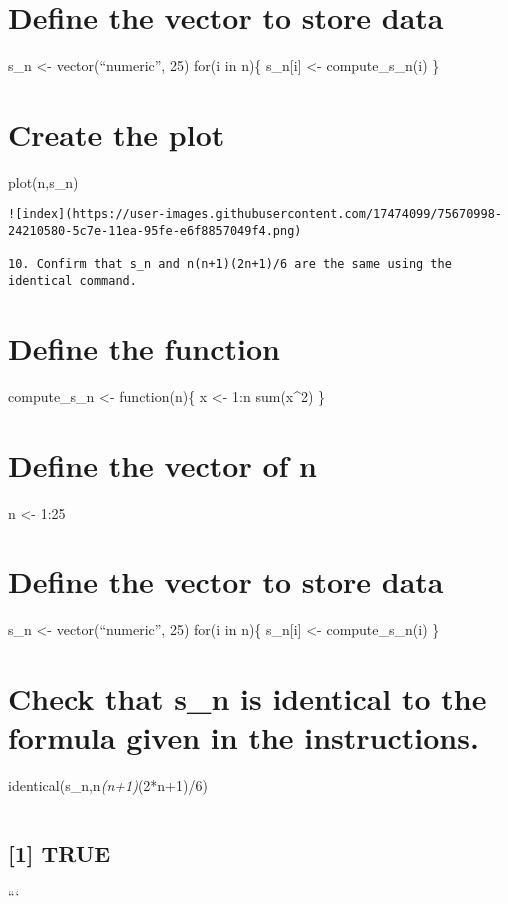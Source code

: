\documentclass[
]{article}
\begin{document}
\hypertarget{define-the-vector-to-store-data}{%
\section{Define the vector to store
data}\label{define-the-vector-to-store-data}}

s\_n \textless- vector(``numeric'', 25) for(i in n)\{ s\_n{[}i{]}
\textless- compute\_s\_n(i) \}

\hypertarget{create-the-plot}{%
\section{Create the plot}\label{create-the-plot}}

plot(n,s\_n)

\begin{verbatim}
![index](https://user-images.githubusercontent.com/17474099/75670998-24210580-5c7e-11ea-95fe-e6f8857049f4.png)

10. Confirm that s_n and n(n+1)(2n+1)/6 are the same using the identical command.
\end{verbatim}

\hypertarget{define-the-function-1}{%
\section{Define the function}\label{define-the-function-1}}

compute\_s\_n \textless- function(n)\{ x \textless- 1:n sum(x\^{}2) \}

\hypertarget{define-the-vector-of-n-1}{%
\section{Define the vector of n}\label{define-the-vector-of-n-1}}

n \textless- 1:25

\hypertarget{define-the-vector-to-store-data-1}{%
\section{Define the vector to store
data}\label{define-the-vector-to-store-data-1}}

s\_n \textless- vector(``numeric'', 25) for(i in n)\{ s\_n{[}i{]}
\textless- compute\_s\_n(i) \}

\hypertarget{check-that-s_n-is-identical-to-the-formula-given-in-the-instructions.}{%
\section{Check that s\_n is identical to the formula given in the
instructions.}\label{check-that-s_n-is-identical-to-the-formula-given-in-the-instructions.}}

identical(s\_n,n\emph{(n+1)}(2*n+1)/6)

\begin{verbatim}
\end{verbatim}

\hypertarget{true}{%
\subsection{{[}1{]} TRUE}\label{true}}

```
\end{document}
